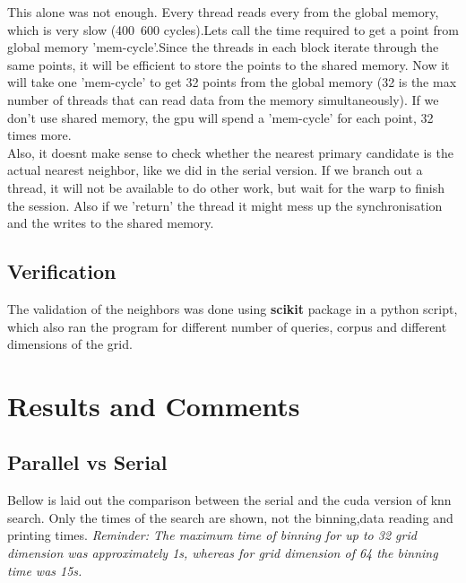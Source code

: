 \documentclass[10pt,a4paper]{article}
\begin{document}
This alone was not enough. Every thread reads every from the global memory, which is very slow (400~600 cycles).Lets call the time required to get a point from global memory 'mem-cycle'.Since the threads in each block iterate through the same points, it will be efficient to store the points to the shared memory. Now it will take one 'mem-cycle' to get 32 points from the global memory (32 is the max number of threads that can read data from the memory simultaneously). If we don't use shared memory, the gpu will spend a 'mem-cycle' for each point, 32 times more. \\ 

Also, it doesnt make sense to check whether the nearest primary candidate is the actual nearest neighbor, like we did in the serial version. If we branch out a thread, it will not be available to do other work, but wait for the warp to finish the session. Also if we 'return' the thread it might mess up the synchronisation and the writes to the shared memory.

\subsection*{Verification}
The validation of the neighbors was done using \textbf{scikit} package in a python script, which also ran the program for different number of queries, corpus and different dimensions of the grid.

\section*{Results and Comments}
\subsection*{Parallel vs Serial}
Bellow is laid out the comparison between the serial and the cuda version of knn search. Only the times of the search are shown, not the binning,data reading and printing times. 
\textit{Reminder: The maximum time of binning for up to 32 grid dimension was approximately 1s, whereas for grid dimension of 64 the binning time was 15s.}
\end{document}
